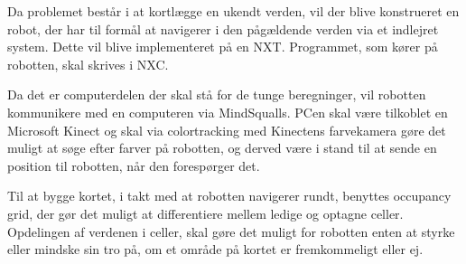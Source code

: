 Da problemet består i at kortlægge en ukendt verden, vil der blive konstrueret en robot, der har til formål at navigerer i den pågældende verden via et indlejret system.
Dette vil blive implementeret på en NXT.
Programmet, som kører på robotten, skal skrives i NXC.

Da det er computerdelen der skal stå for de tunge beregninger, vil robotten kommunikere med en computeren via MindSqualls.
PCen skal være tilkoblet en Microsoft Kinect og skal via colortracking med Kinectens farvekamera gøre det muligt at søge efter farver på robotten, og derved være i stand til at sende en position til robotten, når den forespørger det.

Til at bygge kortet, i takt med at robotten navigerer rundt, benyttes occupancy grid, der gør det muligt at differentiere mellem ledige og optagne celler.
Opdelingen af verdenen i celler, skal gøre det muligt for robotten enten at styrke eller mindske sin tro på, om et område på kortet er fremkommeligt eller ej.
